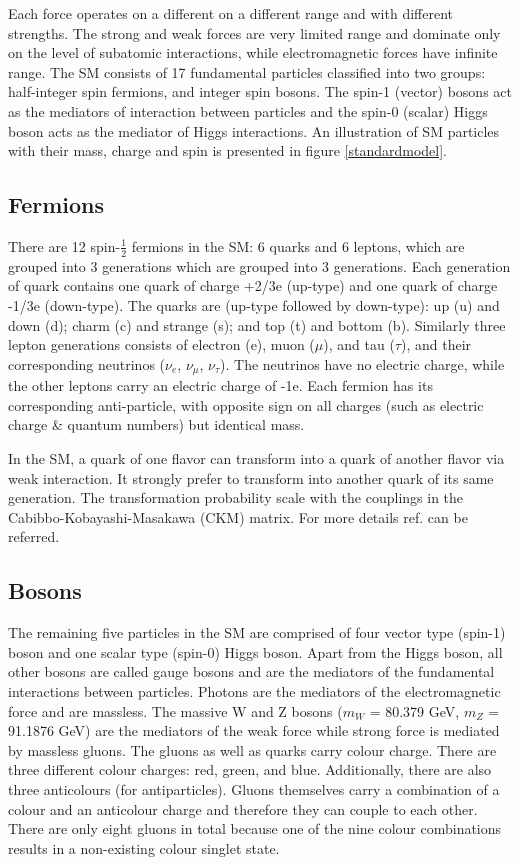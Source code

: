 Each force operates on a different on a different range and with different strengths. The strong and weak forces are very limited range and dominate only on the level of subatomic interactions, while electromagnetic forces have infinite range. The SM consists of 17 fundamental particles classified into two groups: half-integer spin fermions, and integer spin bosons. The spin-1 (vector) bosons act as the mediators of interaction between particles and the spin-0 (scalar) Higgs boson acts as the mediator of Higgs interactions. An illustration of SM particles with their mass, charge and spin is presented in figure \ref{standardmodel}.



\subsection{Fermions}
There are 12 spin-$\frac{1}{2}$ fermions in the SM: 6 quarks and 6 leptons, which are grouped into 3 generations which are grouped into 3 generations. Each generation of quark contains one quark of charge +2/3e (up-type) and one quark of charge -1/3e (down-type). The quarks are (up-type followed by down-type): up (u) and down (d); charm (c) and strange (s); and top (t) and bottom (b). Similarly three lepton generations consists of electron (e), muon ($\mu$), and tau ($\tau$), and their corresponding neutrinos ($\nu_{e}$, $\nu_{\mu}$, $\nu_{\tau}$). The neutrinos have no electric charge, while the other leptons carry an electric charge of -1e. Each fermion has its corresponding anti-particle, with opposite sign on all charges (such as electric charge \& quantum numbers) but identical mass.

In the SM, a quark of one flavor can transform into a quark of another flavor via weak interaction. It strongly prefer to transform into another quark of its same generation. The transformation probability scale with the couplings in the Cabibbo-Kobayashi-Masakawa (CKM) matrix. For more details ref. \cite{Bargiotti:2000dn} can be referred.

\subsection{Bosons}

The remaining five particles in the SM are comprised of four vector type (spin-1) boson and one scalar type (spin-0) Higgs boson. Apart from the Higgs boson, all other bosons are called gauge bosons and are the mediators of the fundamental interactions between particles. Photons are the mediators of the electromagnetic force and are massless. The massive W and Z bosons   ($m_{W}$ = 80.379 GeV, $m_{Z}$ = 91.1876 GeV) are the mediators of the weak force while strong force is mediated by massless gluons. The gluons as well as quarks carry colour charge. There are three different colour charges: red, green, and blue. Additionally, there are also three anticolours (for antiparticles). Gluons themselves carry a combination of a colour and an anticolour charge and therefore they can couple to each other. There are only eight gluons in total because one of the nine colour combinations results in a non-existing colour singlet state. 

